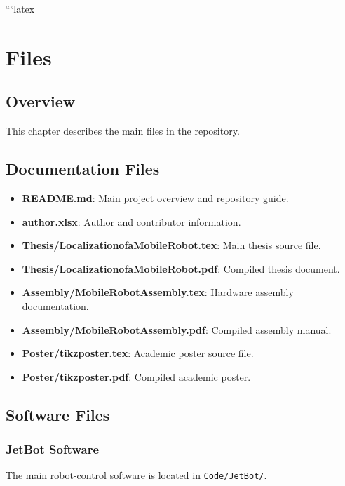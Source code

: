 %
%

```latex
\chapter{Files}

\section{Overview}

This chapter describes the main files in the repository.

\section{Documentation Files}

\begin{itemize}
	\item \textbf{README.md}: Main project overview and repository guide.
	\item \textbf{author.xlsx}: Author and contributor information.
	\item \textbf{Thesis/LocalizationofaMobileRobot.tex}: Main thesis source file.
	\item \textbf{Thesis/LocalizationofaMobileRobot.pdf}: Compiled thesis document.
	\item \textbf{Assembly/MobileRobotAssembly.tex}: Hardware assembly documentation.
	\item \textbf{Assembly/MobileRobotAssembly.pdf}: Compiled assembly manual.
	\item \textbf{Poster/tikzposter.tex}: Academic poster source file.
	\item \textbf{Poster/tikzposter.pdf}: Compiled academic poster.
\end{itemize}

\section{Software Files}

\subsection{JetBot Software}

The main robot-control software is located in \texttt{Code/JetBot/}.

